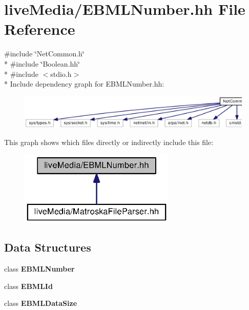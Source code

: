 \section{live\+Media/\+E\+B\+M\+L\+Number.hh File Reference}
\label{EBMLNumber_8hh}
{\ttfamily \#include \char`\"{}Net\+Common.\+h\char`\"{}}\\*
{\ttfamily \#include \char`\"{}Boolean.\+hh\char`\"{}}\\*
{\ttfamily \#include $<$stdio.\+h$>$}\\*
Include dependency graph for E\+B\+M\+L\+Number.\+hh\+:
\nopagebreak
\begin{figure}[H]
\begin{center}
\leavevmode
\includegraphics[width=350pt]{EBMLNumber_8hh__incl}
\end{center}
\end{figure}
This graph shows which files directly or indirectly include this file\+:
\nopagebreak
\begin{figure}[H]
\begin{center}
\leavevmode
\includegraphics[width=211pt]{EBMLNumber_8hh__dep__incl}
\end{center}
\end{figure}
\subsection*{Data Structures}
\begin{DoxyCompactItemize}
\item 
class {\bf E\+B\+M\+L\+Number}
\item 
class {\bf E\+B\+M\+L\+Id}
\item 
class {\bf E\+B\+M\+L\+Data\+Size}
\end{DoxyCompactItemize}
